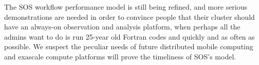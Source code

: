     The SOS workflow performance model is still being refined, and more serious
demonstrations are needed in order to convince people that their cluster should
have an always-on observation and analysis platform, when perhaps all the
admins want to do is run 25-year old Fortran codes and quickly and as often
as possible. We suspect the peculiar needs of future distributed mobile computing
and exascale compute platforms will prove the timeliness of SOS's model.

